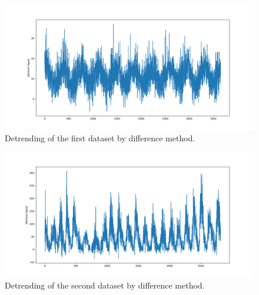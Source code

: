 \documentclass[12pt]{article}
\begin{document}
\begin{enumerate}
\begin{figure}[H]
    \centering
    \begin{minipage}[b]{1\textwidth}
        \includegraphics[width=\textwidth]{figures/Ass1/Ass1_D1_one_diff.png}
    \end{minipage}
    \caption{Detrending of the first dataset by difference method.}
    \label{fig:Ass1_D1_one_diff}
\end{figure}

\begin{figure}[H]
    \centering
    \begin{minipage}[b]{1\textwidth}
        \includegraphics[width=\textwidth]{figures/Ass1/Ass1_D2_one_diff.png}
    \end{minipage}
    \caption{Detrending of the second dataset by difference method.}
    \label{fig:Ass1_D2_one_diff}
\end{figure}


\end{enumerate}
\end{document}
